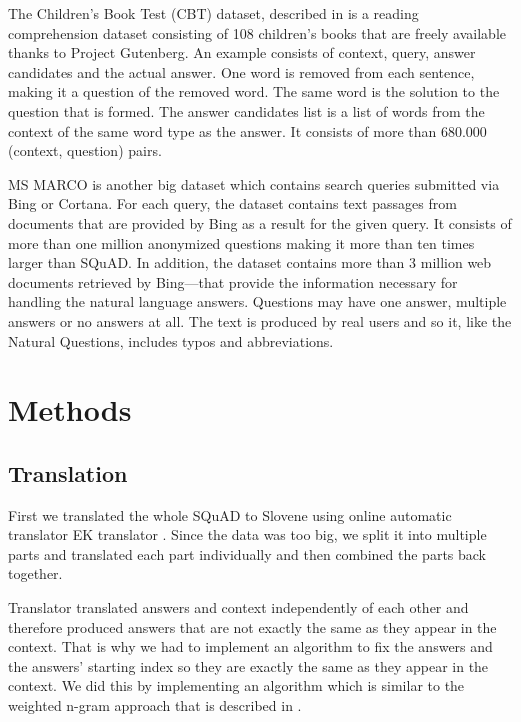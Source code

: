 \documentclass[fleqn,moreauthors,10pt]{ds_report}
\begin{document}
The Children's Book Test (CBT) dataset, described in \cite{cbt} is a reading comprehension dataset consisting of 108 children's books that are freely available thanks to Project Gutenberg. An example consists of context, query, answer candidates and the actual answer. One word is removed from each sentence, making it a question of the removed word. The same word is the solution to the question that is formed. The answer candidates list is a list of words from the context of the same word type as the answer. It consists of more than 680.000 (context, question) pairs.

MS MARCO \cite{marco} is another big dataset which contains search queries submitted via Bing or Cortana. For each query, the dataset contains text passages from documents that are provided by Bing as a result for the given query. It consists of more than one million anonymized questions making it more than ten times larger than SQuAD. In addition, the dataset contains more than 3 million web documents retrieved by Bing—that provide the information necessary for handling the natural language answers. Questions may have one answer, multiple answers or no answers at all. The text is produced by real users and so it, like the Natural Questions, includes typos and abbreviations.



\section*{Methods}


\subsection*{Translation}
First we translated the whole SQuAD to Slovene using online automatic translator EK translator \cite{translator}. Since the data was too big, we split it into multiple parts and translated each part individually and then combined the parts back together.

Translator translated answers and context independently of each other and therefore produced answers that are not exactly the same as they appear in the context. That is why we had to implement an algorithm to fix the answers and the answers' starting index so they are exactly the same as they appear in the context. We did this by implementing an algorithm which is similar to the weighted n-gram approach that is described in \cite{dudekula2019}.
\end{document}
